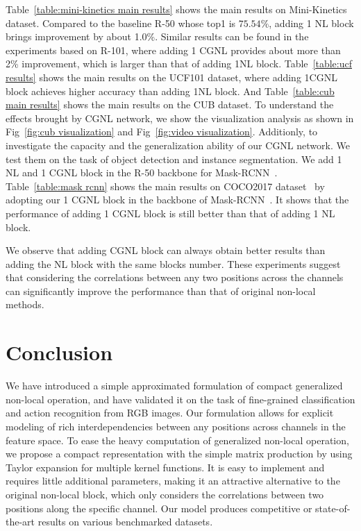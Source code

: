 \documentclass{article}
\begin{document}
Table~\ref{table:mini-kinetics main results} shows the main results on Mini-Kinetics dataset.
Compared to the baseline R-50 whose top1 is $75.54\%$, adding 1 NL block brings improvement by about 1.0\%.
Similar results can be found in the experiments based on R-101, where adding 1 CGNL provides about more than 2\% improvement, which is larger than that of adding 1NL block.
Table~\ref{table:ucf results} shows the main results on the UCF101 dataset, where adding 1CGNL block achieves higher accuracy than adding 1NL block.
And Table~\ref{table:cub main results} shows the main results on the CUB dataset.
To understand the effects brought by CGNL network, we show the visualization analysis as shown in Fig~\ref{fig:cub visualization} and Fig~\ref{fig:video visualization}.
Additionly, to investigate the capacity and the generalization ability of our CGNL network.
We test them on the task of object detection and instance segmentation.
We add 1 NL and 1 CGNL block in the R-50 backbone for Mask-RCNN~\cite{mask-rcnn}. Table~\ref{table:mask rcnn} shows the main results on COCO2017 dataset~\cite{coco2017} by adopting our 1 CGNL block in the backbone of Mask-RCNN~\cite{mask-rcnn}. It shows that the performance of adding 1 CGNL block is still better than that of adding 1 NL block.

We observe that adding CGNL block can always obtain better results than adding the NL block with the same blocks number.
These experiments suggest that considering the correlations between any two positions across the channels can significantly improve the performance than that of original non-local methods.
\section{Conclusion}
We have introduced a simple approximated formulation of compact generalized non-local operation, and have validated it on the task of fine-grained classification and action recognition from RGB images.
Our formulation allows for explicit modeling of rich interdependencies between any positions across channels in the feature space.
To ease the heavy computation of generalized non-local operation, we propose a compact representation with the simple matrix production by using Taylor expansion for multiple kernel functions.
It is easy to implement and requires little additional parameters, making it an attractive alternative to the original non-local block, which only considers the correlations between two positions along the specific channel.
Our model produces competitive or state-of-the-art results on various benchmarked datasets.
\end{document}
